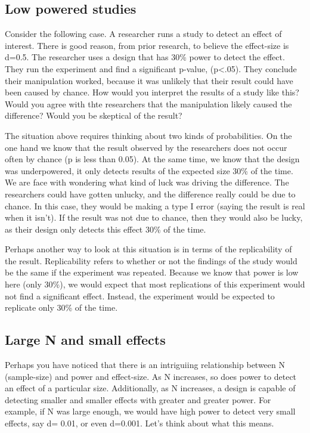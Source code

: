 \documentclass[
  letterpaper,
  DIV=11,
  numbers=noendperiod]{scrreprt}
\begin{document}
\subsection{Low powered studies}\label{low-powered-studies}

Consider the following case. A researcher runs a study to detect an
effect of interest. There is good reason, from prior research, to
believe the effect-size is d=0.5. The researcher uses a design that has
30\% power to detect the effect. They run the experiment and find a
significant p-value, (p\textless.05). They conclude their manipulation
worked, because it was unlikely that their result could have been caused
by chance. How would you interpret the results of a study like this?
Would you agree with thte researchers that the manipulation likely
caused the difference? Would you be skeptical of the result?

The situation above requires thinking about two kinds of probabilities.
On the one hand we know that the result observed by the researchers does
not occur often by chance (p is less than 0.05). At the same time, we
know that the design was underpowered, it only detects results of the
expected size 30\% of the time. We are face with wondering what kind of
luck was driving the difference. The researchers could have gotten
unlucky, and the difference really could be due to chance. In this case,
they would be making a type I error (saying the result is real when it
isn't). If the result was not due to chance, then they would also be
lucky, as their design only detects this effect 30\% of the time.

Perhaps another way to look at this situation is in terms of the
replicability of the result. Replicability refers to whether or not the
findings of the study would be the same if the experiment was repeated.
Because we know that power is low here (only 30\%), we would expect that
most replications of this experiment would not find a significant
effect. Instead, the experiment would be expected to replicate only 30\%
of the time.

\subsection{Large N and small effects}\label{large-n-and-small-effects}

Perhaps you have noticed that there is an intriguiing relationship
between N (sample-size) and power and effect-size. As N increases, so
does power to detect an effect of a particular size. Additionally, as N
increases, a design is capable of detecting smaller and smaller effects
with greater and greater power. For example, if N was large enough, we
would have high power to detect very small effects, say d= 0.01, or even
d=0.001. Let's think about what this means.
\end{document}
